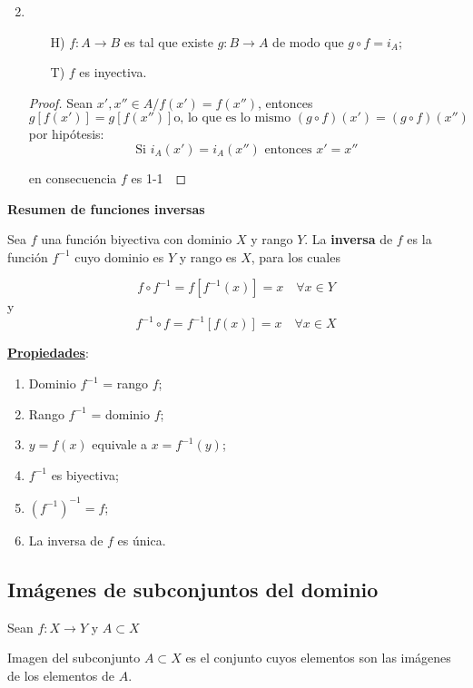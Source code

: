 \begin{fmd-example}
	\begin{enumerate}
		\setcounter{enumi}{1}
		\item \begin{itemize}
			\item[H)] $f: A \rightarrow B$ es tal que existe $g:B \rightarrow A$ de modo
			que $g \circ f = i_A$;
			\item[T)] $f$ es inyectiva.
		\end{itemize}\vspace{3mm}
		\begin{proof}
			Sean $x', x'' \in A / f(x') = f(x'')$, entonces
			\[ g[f(x')] = g[f(x'')] \mbox{o, lo que es lo mismo } (g \circ f)(x') = (g \circ f)(x'') \]
			por hipótesis: \[\mbox{Si } i_A(x') = i_A(x'') \mbox{ entonces } x' = x''\]
			
			en consecuencia $f$ es 1-1\
		\end{proof}
	\end{enumerate}
\end{fmd-example}

\textbf{Resumen de funciones inversas}
\begin{fmd-definition}
	Sea $f$ una función biyectiva con dominio $X$ y rango $Y$. La \textbf{inversa}
	de $f$ es la función $f^{-1}$ cuyo dominio es $Y$ y rango es $X$, para los cuales
	
	\[ f \circ f^{-1} = f[f^{-1}(x)] = x \quad \forall x \in Y \]
	y \[ f^{-1} \circ f = f^{-1}[f(x)] = x  \quad \forall x \in X\]
\end{fmd-definition}

\underline{\textbf{Propiedades}}:

		\begin{enumerate}[label=\roman*)]
			\item Dominio $f^{-1}$ = rango $f$;
			\item Rango $f^{-1}$ = dominio $f$;
			\item $y = f(x)$ equivale a $x = f^{-1}(y)$;

			\setcounter{enumi}{3}
			\item $f^{-1}$ es biyectiva;
			\item $(f^{-1})^{-1} = f$;
			\item La inversa de $f$ es única.
		\end{enumerate}


\subsection{Imágenes de subconjuntos del dominio} \label{sec:imasub}
Sean $f : X \rightarrow Y$ y $A \subset X$ \index{imagen}
\begin{fmd-definition}
	Imagen del subconjunto $A \subset X$ es el conjunto cuyos elementos son las
	imágenes de los elementos de $A$.
\end{fmd-definition}

